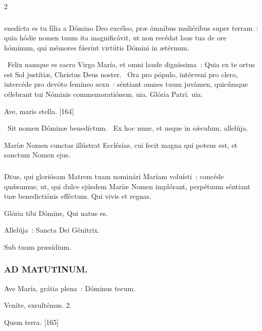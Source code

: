 \documentclass[9pt,twoside]{extarticle}
\begin{document}
\begin{multicols}{2}
\subsubsection*{}
enedícta es tu fília a Dómino Deo excélso, præ ómnibus muliéribus super terram~: quia hódie nomen tuum ita magnificávit, ut non recédat laus tua de ore hóminum, qui mémores fúerint virtútis Dómini in ætérnum.

\begin{tightlist}{}
\item {}~Felix namque es sacra Virgo María, et omni laude digníssima~: \textred{*} Quia ex te ortus est Sol justítiæ, Christus Deus noster.
~Ora pro pópulo, intérveni pro clero, intercéde pro devóto femíneo sexu~: séntiant omnes tuum juvámen, quicúmque célebrant tui Nóminis commemoratiónem. uia. Glória Patri. uia.
\item {} Ave, maris stella. [164]
\item {}~Sit nomen Dóminæ benedíctum. ~Ex hoc nunc, et usque in sǽculum, allelúja.
\item {} Maríæ Nomen cunctas illústrat Ecclésias, cui fecit magna qui potens est, et sanctum Nomen ejus.
\end{tightlist}

\subsubsection*{\center {}}
\lettrine{D}eus, qui gloriósam Matrem tuam nominári Maríam voluísti~: concéde quǽsumus; ut, qui dulce ejúsdem Maríæ Nomen implórant, perpétuum séntiant tuæ benedictiónis efféctum. Qui vivis et regnas.

\begin{tightlist}{}
\item {} Glória tibi Dómine, Qui natus es.
\item {} Allelúja~: Sancta Dei Génitrix.
\item {} Sub tuum præsídium.
\end{tightlist}

\subsubsection*{\center \textsc{AD MATUTINUM.}}
\begin{tightlist}{}
\item {} Ave María, grátia plena~: \textred{*} Dóminus tecum.
\item {} Veníte, exsultémus. 2.
\item {} Quem terra. [165]
\end{tightlist}


\end{multicols}
\end{document}
